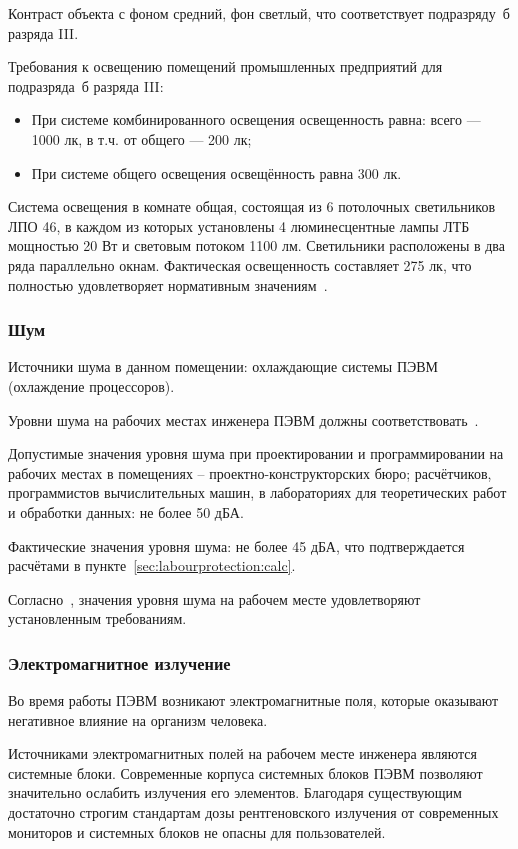 Контраст объекта с фоном средний, фон светлый, что соответствует подразряду~б разряда III.

Требования к освещению помещений промышленных предприятий для подразряда~б разряда III:
\begin{itemize}
	\item При системе комбинированного освещения освещенность равна: всего --- 1000 лк, в т.ч. от общего --- 200 лк;
	\item При системе общего освещения освещённость равна 300 лк.
\end{itemize}

Система освещения в комнате общая, состоящая из 6 потолочных светильников ЛПО 46, в каждом из которых установлены 4 люминесцентные лампы ЛТБ мощностью 20 Вт и световым потоком 1100 лм. Светильники расположены в два ряда параллельно окнам. Фактическая освещенность составляет 275 лк, что полностью удовлетворяет нормативным значениям~\cite{SNiP23_05_95}.

\subsubsection{Шум}
Источники шума в данном помещении: охлаждающие системы ПЭВМ (охлаждение процессоров).

Уровни шума на рабочих местах инженера ПЭВМ должны соответствовать~\cite{GOST12_1_003}.

Допустимые значения уровня шума при проектировании и программировании на рабочих местах в помещениях – проектно-конструкторских бюро; расчётчиков, программистов вычислительных машин, в лабораториях для теоретических работ и обработки данных: не более  50 дБА.

Фактические значения уровня шума: не более 45 дБА, что подтверждается расчётами в пункте~\ref{sec:labourprotection:calc}.

Согласно~\cite{GOST12_1_003}, значения уровня шума на рабочем месте удовлетворяют установленным требованиям.

\subsubsection{Электромагнитное излучение}
Во время работы ПЭВМ возникают электромагнитные поля, которые оказывают негативное влияние на организм человека.

Источниками электромагнитных полей на рабочем месте инженера являются системные блоки. Современные корпуса системных блоков ПЭВМ позволяют значительно ослабить излучения его элементов. Благодаря существующим достаточно строгим стандартам дозы рентгеновского излучения от современных мониторов и системных блоков не опасны для пользователей.


